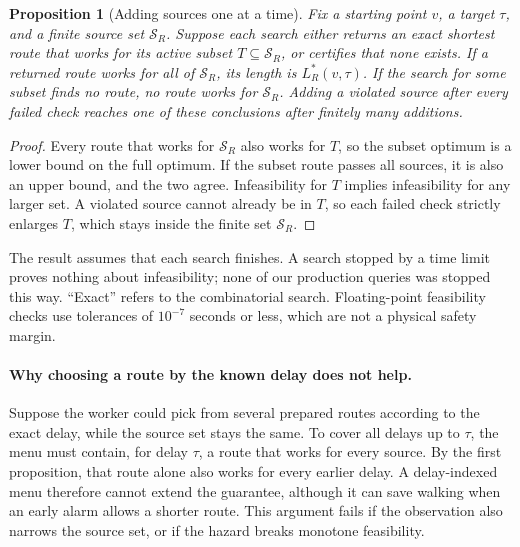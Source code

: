 \documentclass[11pt,a4paper]{article}
\newtheorem{proposition}{Proposition}
\newcommand{\Sc}{\mathcal{S}}
\begin{document}
\begin{proposition}[Adding sources one at a time]
Fix a starting point $v$, a target $\tau$, and a finite source set $\Sc_R$. Suppose each search either returns an exact shortest route that works for its active subset $T\subseteq\Sc_R$, or certifies that none exists. If a returned route works for all of $\Sc_R$, its length is $L_R^*(v,\tau)$. If the search for some subset finds no route, no route works for $\Sc_R$. Adding a violated source after every failed check reaches one of these conclusions after finitely many additions.
\end{proposition}
\begin{proof}
Every route that works for $\Sc_R$ also works for $T$, so the subset optimum is a lower bound on the full optimum. If the subset route passes all sources, it is also an upper bound, and the two agree. Infeasibility for $T$ implies infeasibility for any larger set. A violated source cannot already be in $T$, so each failed check strictly enlarges $T$, which stays inside the finite set $\Sc_R$.
\end{proof}
The result assumes that each search finishes. A search stopped by a time limit proves nothing about infeasibility; none of our production queries was stopped this way. ``Exact'' refers to the combinatorial search. Floating-point feasibility checks use tolerances of $10^{-7}$ seconds or less, which are not a physical safety margin.

\paragraph{Why choosing a route by the known delay does not help.}
Suppose the worker could pick from several prepared routes according to the exact delay, while the source set stays the same. To cover all delays up to $\tau$, the menu must contain, for delay $\tau$, a route that works for every source. By the first proposition, that route alone also works for every earlier delay. A delay-indexed menu therefore cannot extend the guarantee, although it can save walking when an early alarm allows a shorter route. This argument fails if the observation also narrows the source set, or if the hazard breaks monotone feasibility.
\end{document}
